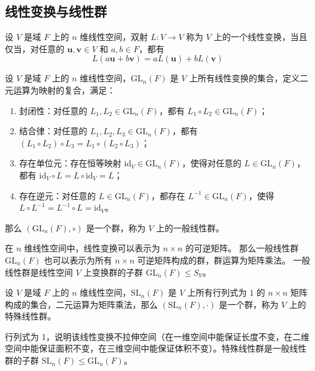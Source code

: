 \vspace{1em}
\subsection{线性变换与线性群}
\begin{definition}
    设 $V$ 是域 $F$ 上的 $n$ 维线性空间，双射 $L:V\to V$ 称为 $V$ 上的一个线性变换，当且仅当，对任意的 $\mathbf{u}, \mathbf{v}\in V$ 和 $a, b\in F$，都有
    \[
        L(a\mathbf{u} + b\mathbf{v}) = aL(\mathbf{u}) + bL(\mathbf{v})
    \]
\end{definition}

\begin{definition}
    设 $V$ 是域 $F$ 上的 $n$ 维线性空间，$\mathrm{GL}_n(F)$ 是 $V$ 上所有线性变换的集合，定义二元运算为映射的复合，满足：
    \begin{enumerate}
        \item 封闭性：对任意的 $L_1, L_2\in \mathrm{GL}_n(F)$，都有 $L_1 \circ L_2 \in \mathrm{GL}_n(F)$；
        \item 结合律：对任意的 $L_1, L_2, L_3\in \mathrm{GL}_n(F)$，都有 $(L_1 \circ L_2) \circ L_3 = L_1 \circ (L_2 \circ L_3)$；
        \item 存在单位元：存在恒等映射 $\mathrm{id}_V\in \mathrm{GL}_n(F)$，使得对任意的 $L\in \mathrm{GL}_n(F)$，都有 $\mathrm{id}_V \circ L = L \circ \mathrm{id}_V = L$；
        \item 存在逆元：对任意的 $L\in \mathrm{GL}_n(F)$，都存在 $L^{-1}\in \mathrm{GL}_n(F)$，使得 $L \circ L^{-1} = L^{-1} \circ L = \mathrm{id}_V$。
    \end{enumerate}    
    那么 $(\mathrm{GL}_n(F), \circ)$ 是一个群，称为 $V$ 上的一般线性群。
\end{definition}

\begin{note}
    在 $n$ 维线性空间中，线性变换可以表示为 $n\times n$ 的可逆矩阵。
    那么一般线性群 $\mathrm{GL}_n(F)$ 也可以表示为所有 $n\times n$ 可逆矩阵构成的群，群运算为矩阵乘法。
    一般线性群是线性空间 $V$ 上变换群的子群 $\mathrm{GL}_n(F) \leq S_V$。
\end{note}

\vspace{0.5em}

\begin{definition}
    设 $V$ 是域 $F$ 上的 $n$ 维线性空间，$\mathrm{SL}_n(F)$ 是 $V$ 上所有行列式为 $1$ 的 $n\times n$ 矩阵构成的集合，二元运算为矩阵乘法，那么 $(\mathrm{SL}_n(F), \cdot)$ 是一个群，称为 $V$ 上的特殊线性群。
\end{definition}
\begin{note}
    行列式为 1，说明该线性变换不拉伸空间（在一维空间中能保证长度不变，在二维空间中能保证面积不变，在三维空间中能保证体积不变）。特殊线性群是一般线性群的子群 $\mathrm{SL}_n(F) \leq \mathrm{GL}_n(F)$。
\end{note}


